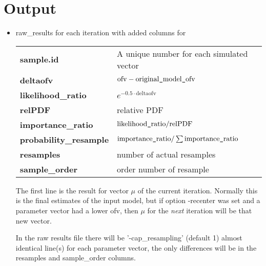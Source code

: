 \section{Output}
\begin{itemize}
\item raw\_results for each iteration with added columns for\\
\begin{tabular}{ll}
\bf{sample.id} & A unique number for each simulated vector\\
\bf{deltaofv} & $\mathrm{ofv} - \mathrm{original}\mbox{\tt\string_}\mathrm{model}\mbox{\tt\string_}\mathrm{ofv}$\\
\bf{likelihood\_ratio} & $e^{-0.5\cdot \mathrm{deltaofv}}$ \\
\bf{relPDF} & relative PDF \\
\bf{importance\_ratio} & $\mathrm{likelihood}\mbox{\tt\string_}\mathrm{ratio}/\mathrm{relPDF}$\\
\bf{probability\_resample} & $\mathrm{importance}\mbox{\tt\string_}\mathrm{ratio}/\sum{\mathrm{importance}\mbox{\tt\string_}\mathrm{ratio}}$ \\
\bf{resamples} & number of actual resamples \\
\bf{sample\_order} & order number of resample \\
\end{tabular}

The first line is the result for vector $\mu$ of the current iteration. Normally this is the final estimates of the
input model, but if option -recenter was set and a parameter vector had a lower ofv, then $\mu$ for the \emph{next} iteration
will be that new vector.

In the raw results file there will be '-cap\_resampling' (default 1) almost identical line(s) for each parameter vector,
the only differences will be in the resamples and sample\_order columns.


\end{itemize}
